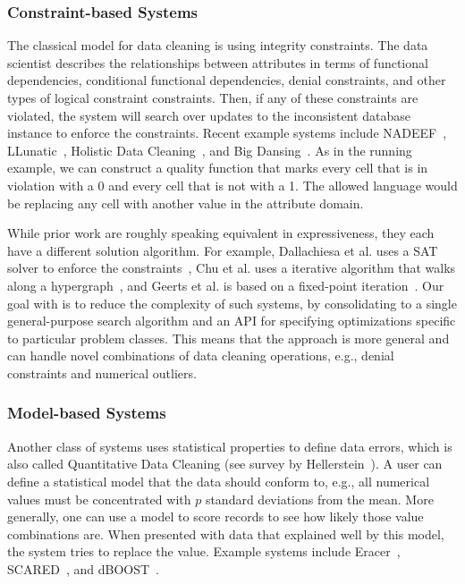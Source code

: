 \subsubsection{Constraint-based Systems}
The classical model for data cleaning is using integrity constraints. 
The data scientist describes the relationships between attributes in terms of functional dependencies, conditional functional dependencies, denial constraints, and other types of logical constraint constraints.
Then, if any of these constraints are violated, the system will search over updates to the inconsistent database instance to enforce the constraints.
Recent example systems include NADEEF~\cite{DBLP:conf/sigmod/DallachiesaEEEIOT13}, LLunatic~\cite{geerts2013llunatic}, Holistic Data Cleaning~\cite{chu2013holistic}, and Big Dansing~\cite{khayyat2015bigdansing}.
As in the running example, we can construct a quality function that marks every cell that is in violation with a 0 and every cell that is not with a 1.
The allowed language would be replacing any cell with another value in the attribute domain.

While prior work are roughly speaking equivalent in expressiveness, they each have a different solution algorithm.
For example, Dallachiesa et al. uses a SAT solver to enforce the constraints~\cite{DBLP:conf/sigmod/DallachiesaEEEIOT13}, Chu et al. uses a iterative algorithm that walks along a hypergraph~\cite{chu2013holistic}, and Geerts et al. is based on a fixed-point iteration~\cite{geerts2013llunatic}.
Our goal with \sys is to reduce the complexity of such systems, by consolidating to a single general-purpose search algorithm and an API for specifying optimizations specific to particular problem classes.
This means that the approach is more general and can handle novel combinations of data cleaning operations, e.g., denial constraints and numerical outliers.

\subsubsection{Model-based Systems}
Another class of systems uses statistical properties to define data errors, which is also called Quantitative Data Cleaning (see survey by Hellerstein~\cite{hellerstein2008quantitative}).
A user can define a statistical model that the data should conform to, e.g., all numerical values must be concentrated with $p$ standard deviations from the mean. 
More generally, one can use a model to score records to see how likely those value combinations are.
When presented with data that explained well by this model, the system tries to replace the value.
Example systems include Eracer~\cite{eracer}, SCARED~\cite{yakout2013don}, and dBOOST~\cite{pit2016outlier}.

